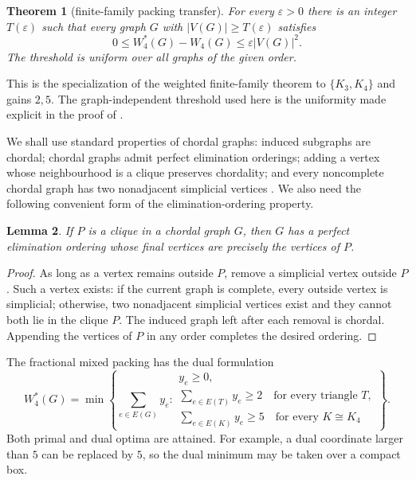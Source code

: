 \documentclass[11pt,reqno]{amsart}
\numberwithin{equation}{section}
\newtheorem{theorem}{Theorem}[section]
\newtheorem{lemma}[theorem]{Lemma}
\theoremstyle{definition}
\theoremstyle{remark}
\newcommand{\Wint}{W_4}
\newcommand{\Wfrac}{W_4^*}
\begin{document}
\begin{theorem}[finite-family packing transfer]
\label{thm:packing-transfer}
For every $\varepsilon>0$ there is an integer $T(\varepsilon)$ such that every
graph $G$ with $|V(G)|\geq T(\varepsilon)$ satisfies
\[
  0\leq \Wfrac(G)-\Wint(G)\leq
  \varepsilon |V(G)|^2.
\]
The threshold is uniform over all graphs of the given order.
\end{theorem}

This is the specialization of the weighted finite-family theorem
\cite[Theorem~3.4]{RohatgiUrschelWellens2021} to $\{K_3,K_4\}$ and gains
$2,5$.  The graph-independent threshold used here is the uniformity made
explicit in the proof of
\cite[Theorem~3.6]{RohatgiUrschelWellens2021}.

We shall use standard properties of chordal graphs: induced subgraphs are
chordal; chordal graphs admit perfect elimination orderings; adding a vertex
whose neighbourhood is a clique preserves chordality; and every noncomplete
chordal graph has two nonadjacent simplicial vertices
\cite{Dirac1961,BlairPeyton1993}.  We also need the following convenient form
of the elimination-ordering property.

\begin{lemma}\label{lem:peo-ending-clique}
If $P$ is a clique in a chordal graph $G$, then $G$ has a perfect elimination
ordering whose final vertices are precisely the vertices of $P$.
\end{lemma}

\begin{proof}
As long as a vertex remains outside $P$, remove a simplicial vertex outside
$P$.  Such a vertex exists: if the current graph is complete, every outside
vertex is simplicial; otherwise, two nonadjacent simplicial vertices exist and
they cannot both lie in the clique $P$.  The induced graph left after each
removal is chordal.  Appending the vertices of $P$ in any order completes the
desired ordering.
\end{proof}

The fractional mixed packing has the dual formulation
\begin{equation}\label{eq:mixed-dual}
  \Wfrac(G)=\min\left\{
  \sum_{e\in E(G)}y_e:
  \begin{array}{l}
    y_e\geq0,\\[2pt]
    \sum_{e\in E(T)}y_e\geq2\quad\text{for every triangle }T,\\[2pt]
    \sum_{e\in E(K)}y_e\geq5\quad\text{for every }K\cong K_4
  \end{array}\right\}.
\end{equation}
Both primal and dual optima are attained.  For example, a dual coordinate
larger than $5$ can be replaced by $5$, so the dual minimum may be taken over
a compact box.
\end{document}
